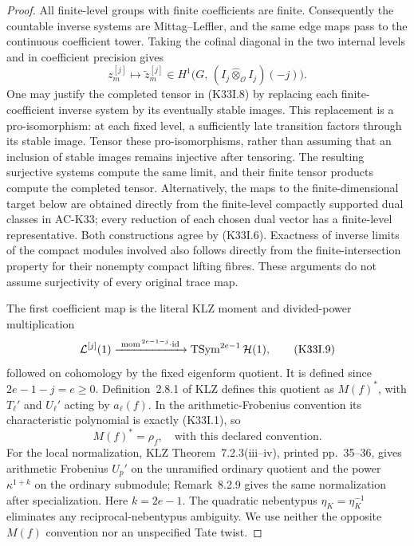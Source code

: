 \begin{proof}
All finite-level groups with finite coefficients are finite.
Consequently the countable inverse systems are Mittag--Leffler,
and the same edge maps pass to the continuous coefficient tower.
Taking the cofinal diagonal in the two internal levels and in
coefficient precision gives
\[
 z_m^{[j]}\longmapsto
 \widetilde z_m^{[j]}
 \in H^1\bigl(G,\,(I_j\widehat\otimes_{\mathcal O}I_j)(-j)\bigr).
                                                               \tag{K33I.8}
\]
One may justify the completed tensor in (K33I.8) by replacing each
finite-coefficient inverse system by its eventually stable images.
This replacement is a pro-isomorphism: at each fixed level, a
sufficiently late transition factors through its stable image.
Tensor these pro-isomorphisms, rather than assuming that an inclusion
of stable images remains injective after tensoring.  The resulting
surjective systems compute the same limit, and their finite tensor
products compute the completed tensor.  Alternatively,
the maps to the finite-dimensional target below are obtained directly
from the finite-level compactly supported dual classes in AC-K33;
every reduction of each chosen dual vector has a finite-level
representative.  Both constructions agree by (K33I.6).
Exactness of inverse limits of the compact modules involved also
follows directly from the finite-intersection property for their
nonempty compact lifting fibres.  These arguments do not assume
surjectivity of every original trace map.

The first coefficient map is the literal KLZ moment and divided-power
multiplication
\[
 {\cal L}^{[j]}(1)
 \xrightarrow{\ \mathrm{mom}^{\,2e-1-j}\cdot\mathrm{id}\ }
 \operatorname{TSym}^{2e-1}{\cal H}(1),            \tag{K33I.9}
\]
followed on cohomology by the fixed eigenform quotient.
It is defined since \(2e-1-j=e\geq0\).
Definition~2.8.1 of KLZ defines this quotient as \(M(f)^*\), with
\(T_\ell'\) and \(U_\ell'\) acting by \(a_\ell(f)\).
In the arithmetic-Frobenius convention its characteristic polynomial
is exactly (K33I.1), so
\[
 M(f)^*=\rho_f,\quad\text{with this declared convention}.         \tag{K33I.10}
\]
For the local normalization, KLZ Theorem~7.2.3(iii--iv), printed
pp.~35--36, gives arithmetic Frobenius \(U_p'\) on the unramified
ordinary quotient and the power \(\kappa^{1+k}\) on the ordinary
submodule; Remark~8.2.9 gives the same normalization after
specialization.  Here \(k=2e-1\).  The quadratic nebentypus
\(\eta_K=\eta_K^{-1}\) eliminates any reciprocal-nebentypus ambiguity.
We use neither the opposite \(M(f)\) convention nor an unspecified
Tate twist.


\end{proof}
